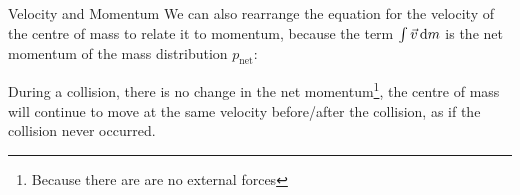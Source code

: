 \documentclass[12pt,compress,aspectratio=169]{beamer}
\begin{document}
\begin{frame}{Velocity and Momentum}
  We can also rearrange the equation for the velocity of the centre of mass to
  relate it to momentum, because the term $\int\vec v\dl m$ is the net momentum
  of the mass distribution $p_\text{net}$:
  

  During a collision, there is no change in the net momentum\footnote{Because
  there are are no external forces}, the centre of mass will continue to move
  at the same velocity before/after the collision, as if the collision never
  occurred.
\end{frame}
\end{document}
